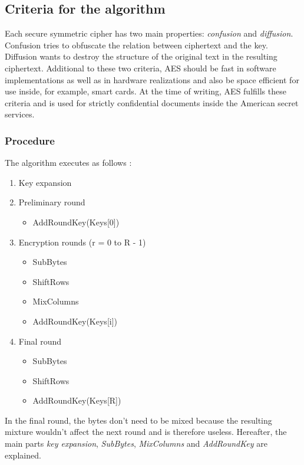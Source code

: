 \subsection{Criteria for the algorithm}

Each secure symmetric cipher has two main properties:
\textit{confusion} and \textit{diffusion}. Confusion tries to obfuscate
the relation between ciphertext and the key. Diffusion wants to
destroy the structure of the original text in the resulting ciphertext.
Additional to these two criteria, AES should be fast in software implementations
as well as in hardware realizations and also be space efficient for use
inside, for example, smart cards. At the time of writing, AES fulfills these
criteria and is used for strictly confidential documents inside the American
secret services.

\subsubsection{Procedure}

The algorithm executes as follows \cite{wikipedia_aes}:
\begin{enumerate}
  \item Key expansion
  \item Preliminary round
    \begin{itemize}
      \item AddRoundKey(Keys[0])
    \end{itemize}
  \item Encryption rounds (r = 0 to R - 1)
    \begin{itemize}
      \item SubBytes
      \item ShiftRows
      \item MixColumns
      \item AddRoundKey(Keys[i]) 
    \end{itemize}
  \item Final round
    \begin{itemize}
      \item SubBytes
      \item ShiftRows
      \item AddRoundKey(Keys[R]) 
    \end{itemize}
\end{enumerate}

In the final round, the bytes don't need to be mixed because the resulting
mixture wouldn't affect the next round and is therefore useless.
Hereafter, the main parts \textit{key expansion}, \textit{SubBytes},
\textit{MixColumns} and \textit{AddRoundKey} are explained.

